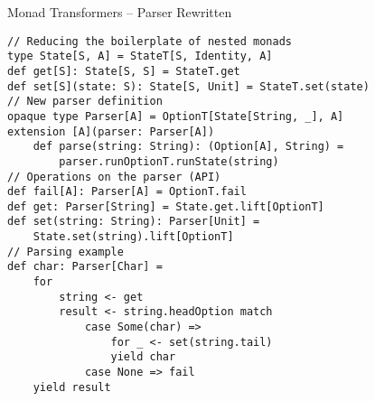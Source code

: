 \documentclass[presentation, 10pt]{beamer}\mode<presentation>{\usetheme{metropolis}}
\begin{document}
\begin{frame}[fragile, shrink=15]{Monad Transformers -- Parser Rewritten}
\begin{tcolorbox}
\begin{verbatim}
// Reducing the boilerplate of nested monads
type State[S, A] = StateT[S, Identity, A]
def get[S]: State[S, S] = StateT.get
def set[S](state: S): State[S, Unit] = StateT.set(state)
// New parser definition
opaque type Parser[A] = OptionT[State[String, _], A]
extension [A](parser: Parser[A])
	def parse(string: String): (Option[A], String) =
		parser.runOptionT.runState(string)
// Operations on the parser (API)
def fail[A]: Parser[A] = OptionT.fail
def get: Parser[String] = State.get.lift[OptionT]
def set(string: String): Parser[Unit] =
	State.set(string).lift[OptionT]
// Parsing example
def char: Parser[Char] =
	for
		string <- get
		result <- string.headOption match
			case Some(char) =>
				for _ <- set(string.tail)
				yield char
			case None => fail
	yield result
\end{verbatim}
\end{tcolorbox}
\end{frame}
\end{document}
